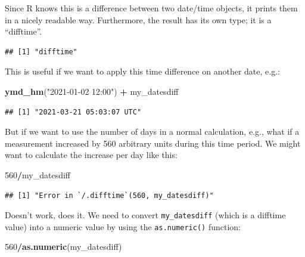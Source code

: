 \documentclass[
  12pt,
  krantz2]{krantz}
\makeatletter
\newenvironment{Shaded}{\begin{snugshade}}{\end{snugshade}}
\newcommand{\DecValTok}[1]{\textcolor[rgb]{0.00,0.00,0.81}{#1}}
\newcommand{\KeywordTok}[1]{\textcolor[rgb]{0.13,0.29,0.53}{\textbf{#1}}}
\newcommand{\NormalTok}[1]{#1}
\newcommand{\OperatorTok}[1]{\textcolor[rgb]{0.81,0.36,0.00}{\textbf{#1}}}
\newcommand{\StringTok}[1]{\textcolor[rgb]{0.31,0.60,0.02}{#1}}
\newenvironment{kframe}{%
\medskip{}
\setlength{\fboxsep}{.8em}
 \def\at@end@of@kframe{}%
 \ifinner\ifhmode%
  \def\at@end@of@kframe{\end{minipage}}%
  \begin{minipage}{\columnwidth}%
 \fi\fi%
 \def\FrameCommand##1{\hskip\@totalleftmargin \hskip-\fboxsep
 \colorbox{shadecolor}{##1}\hskip-\fboxsep
     \hskip-\linewidth \hskip-\@totalleftmargin \hskip\columnwidth}%
 \MakeFramed {\advance\hsize-\width
   \@totalleftmargin\z@ \linewidth\hsize
   \@setminipage}}%
 {\par\unskip\endMakeFramed%
 \at@end@of@kframe}
\renewenvironment{Shaded}{\begin{kframe}}{\end{kframe}}
\makeatother
\begin{document}
Since R knows this is a difference between two date/time objects, it prints them in a nicely readable way.
Furthermore, the result has its own type; it is a ``difftime''.

\begin{Shaded}
\end{Shaded}

\begin{verbatim}
## [1] "difftime"
\end{verbatim}

This is useful if we want to apply this time difference on another date, e.g.:

\begin{Shaded}
\begin{Highlighting}[]
\KeywordTok{ymd_hm}\NormalTok{(}\StringTok{"2021-01-02 12:00"}\NormalTok{) }\OperatorTok{+}\StringTok{ }\NormalTok{my_datesdiff}
\end{Highlighting}
\end{Shaded}

\begin{verbatim}
## [1] "2021-03-21 05:03:07 UTC"
\end{verbatim}

But if we want to use the number of days in a normal calculation, e.g., what if a measurement increased by 560 arbitrary units during this time period.
We might want to calculate the increase per day like this:

\begin{Shaded}
\begin{Highlighting}[]
\DecValTok{560}\OperatorTok{/}\NormalTok{my_datesdiff}
\end{Highlighting}
\end{Shaded}

\begin{verbatim}
## [1] "Error in `/.difftime`(560, my_datesdiff)"
\end{verbatim}

Doesn't work, does it.
We need to convert \texttt{my\_datesdiff} (which is a difftime value) into a numeric value by using the \texttt{as.numeric()} function:

\begin{Shaded}
\begin{Highlighting}[]
\DecValTok{560}\OperatorTok{/}\KeywordTok{as.numeric}\NormalTok{(my_datesdiff)}
\end{Highlighting}
\end{Shaded}
\end{document}
